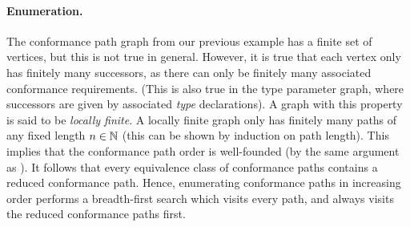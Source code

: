 \documentclass[../generics]{subfiles}
\begin{document}
\paragraph{Enumeration.} The conformance path graph from our previous example has a finite set of vertices, but this is not true in general. However, it is true that each vertex only has finitely many successors, as there can only be finitely many associated conformance requirements. (This is also true in the type parameter graph, where successors are given by associated \emph{type} declarations). A graph with this property is said to be \emph{locally finite}. A locally finite graph only has finitely many paths of any fixed length $n\in\mathbb{N}$ (this can be shown by induction on path length). This implies that the conformance path order is well-founded (by the same argument as ). It follows that every equivalence class of conformance paths contains a reduced conformance path. Hence, enumerating conformance paths in increasing order performs a breadth-first search which visits every path, and always visits the reduced conformance paths first.
\end{document}
